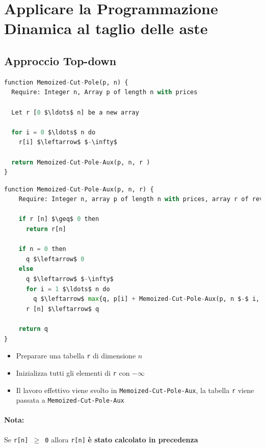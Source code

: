 \section{Applicare la Programmazione Dinamica al taglio delle aste}

\subsection{Approccio Top-down}

\begin{lstlisting}[language=Python, mathescape=true]
function Memoized-Cut-Pole(p, n) {
  Require: Integer n, Array p of length n with prices

  Let r [0 $\ldots$ n] be a new array

  for i = 0 $\ldots$ n do
    r[i] $\leftarrow$ $-\infty$

  return Memoized-Cut-Pole-Aux(p, n, r )
}
\end{lstlisting}

\begin{lstlisting}[language=Python, mathescape=true]
function Memoized-Cut-Pole-Aux(p, n, r) {
    Require: Integer n, array p of length n with prices, array r of revenues

    if r [n] $\geq$ 0 then
      return r[n]

    if n = 0 then
      q $\leftarrow$ 0
    else
      q $\leftarrow$ $-\infty$
      for i = 1 $\ldots$ n do
        q $\leftarrow$ max{q, p[i] + Memoized-Cut-Pole-Aux(p, n $-$ i, r )}
      r [n] $\leftarrow$ q

    return q
}
\end{lstlisting}

\begin{itemize}
  \item
        Preparare una tabella \texttt{r} di dimensione $n$
  \item
        Inizializza tutti gli elementi di \texttt{r} con $-\infty$
  \item
        Il lavoro effettivo viene svolto in \texttt{Memoized-Cut-Pole-Aux}, la
        tabella \texttt{r} viene passata a \texttt{Memoized-Cut-Pole-Aux}
\end{itemize}

\paragraph*{Nota:} Se \texttt{r{[}n{]}\ $\geq$\ 0} allora \texttt{r{[}n{]}}
\textbf{è stato calcolato in precedenza}


